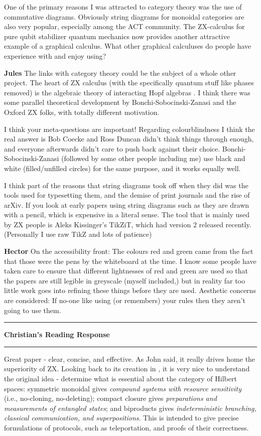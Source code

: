 \documentclass{amsart}
\newcommand{\iam}[1]{
  \vspace{0.25em}
  \hrule
  \vspace{0.25em}
  \textbf{{#1}'s Reading Response}
  \vspace{0.25em}
  \hrule
  \vspace{1em}
}
\newcommand{\respond}[1]{
  \vspace{1em} \textbf{#1}
}
\begin{document}
One of the primary reasons I was attracted to category theory was the use of
commutative diagrams. Obviously string diagrams for monoidal categories are also very
popular, especially among the ACT community. The ZX-calculus for pure qubit stabilizer
quantum mechanics now provides another attractive example of a graphical calculus.
What other graphical calculuses do people have experience with and enjoy using?

\respond{Jules} The links with category theory could be the subject of a whole other project. The heart of ZX calculus (with the specifically quantum stuff like phases removed) is the algebraic theory of interacting Hopf algebras \cite{BSZ_hopf}. I think there was some parallel theoretical development by Bonchi-Sobocinski-Zanasi and the Oxford ZX folks, with totally different motivation.

I think your meta-questions are important! Regarding colourblindness I think the real answer is Bob Coecke and Ross Duncan didn't think things through enough, and everyone afterwards didn't care to push back against their choice. Bonchi-Sobocinski-Zanasi (followed by some other people including me) use black and white (filled/unfilled circles) for the same purpose, and it works equally well.

I think part of the reasons that string diagrams took off when they did was the tools used for typesetting them, and the demise of print journals and the rise of arXiv. If you look at early papers using string diagrams such as \cite{joyal_street} they are drawn with a pencil, which is expensive in a literal sense. The tool that is mainly used by ZX people is Aleks Kissinger's TikZiT, which had version 2 released recently. (Personally I use raw TikZ and lots of patience)

\respond{Hector} On the accessibility front:
The colours red and green came from the fact that those were the pens by the whiteboard at the time.
I know some people have taken care to ensure that different lightnesses of red and green are used
so that the papers are still legible in greyscale (myself included,)
but in reality far too little work goes into refining these things before they are used.
Aesthetic concerns are considered: If no-one like using (or remembers) your rules then they aren't going to use them.

\iam{Christian}

Great paper - clear, concise, and effective. As John said, it really drives home the superiority of ZX. Looking back to its creation in \cite{zx}, it is very nice to understand the original idea - determine what is essential about the category of Hilbert spaces: symmetric monoidal gives \emph{compound systems with resource sensitivity} (i.e., no-cloning, no-deleting); compact closure gives \emph{preparations and measurements of entangled states}; and biproducts gives \emph{indeterministic branching, classical communication, and superpositions}. This is intended to give precise formulations of protocols, such as teleportation, and proofs of their correctness.
\end{document}
